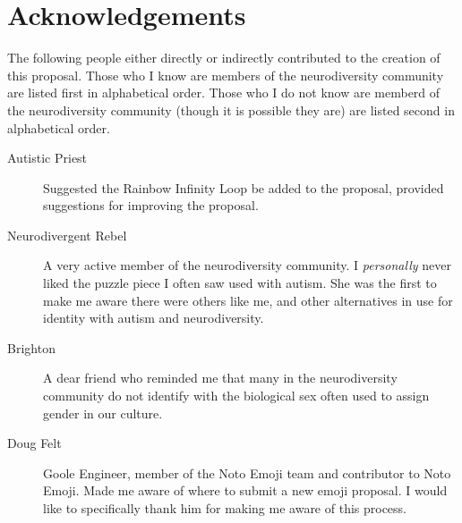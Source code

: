 \section{Acknowledgements}

The following people either directly or indirectly contributed to the creation of this
proposal. Those who I know are members of the neurodiversity community are listed first
in alphabetical order. Those who I do not know are memberd of the neurodiversity community
(though it is possible they are) are listed second in alphabetical order.

\begin{description}
  \item[Autistic Priest] Suggested the Rainbow Infinity Loop be added to the proposal, provided suggestions for improving the proposal.
  \item[Neurodivergent Rebel] A very active member of the neurodiversity community. I \emph{personally} never liked the puzzle piece I often saw used with autism. She was the first to make me aware there were others like me, and other alternatives in use for identity with autism and neurodiversity.
  \item[Brighton] A dear friend who reminded me that many in the neurodiversity community do not identify with the biological sex often used to assign gender in our culture.
  \item[Doug Felt] Goole Engineer, member of the Noto Emoji team and contributor to Noto Emoji. Made me aware of where to submit a new emoji proposal. I would like to specifically thank him for making me aware of this process.
\end{description}
